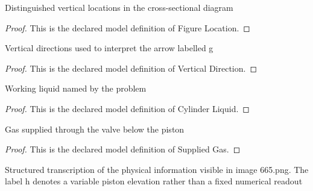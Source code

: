 \begin{definition}
  \label{def:physics:phyx-mini-0665:phyxminiproblems-problemphyxmini0665-figurelocation}
  Distinguished vertical locations in the cross-sectional diagram
\end{definition}
\begin{proof}
  This is the declared model definition of Figure Location.
\end{proof}
\begin{definition}
  \label{def:physics:phyx-mini-0665:phyxminiproblems-problemphyxmini0665-verticaldirection}
  Vertical directions used to interpret the arrow labelled g
\end{definition}
\begin{proof}
  This is the declared model definition of Vertical Direction.
\end{proof}
\begin{definition}
  \label{def:physics:phyx-mini-0665:phyxminiproblems-problemphyxmini0665-cylinderliquid}
  Working liquid named by the problem
\end{definition}
\begin{proof}
  This is the declared model definition of Cylinder Liquid.
\end{proof}
\begin{definition}
  \label{def:physics:phyx-mini-0665:phyxminiproblems-problemphyxmini0665-suppliedgas}
  Gas supplied through the valve below the piston
\end{definition}
\begin{proof}
  This is the declared model definition of Supplied Gas.
\end{proof}
\begin{definition}
  \label{def:physics:phyx-mini-0665:phyxminiproblems-problemphyxmini0665-pistoncylinderfigure}
  Structured transcription of the physical information visible in image 665.png. The label h denotes a variable piston elevation rather than a fixed numerical readout
\end{definition}
